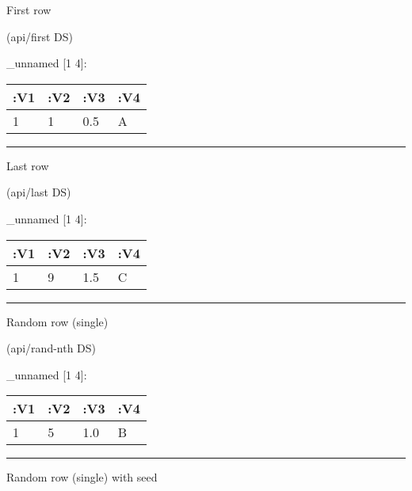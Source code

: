 \documentclass[]{article}
\newenvironment{Shaded}{\begin{snugshade}}{\end{snugshade}}
\newcommand{\NormalTok}[1]{#1}
\begin{document}
First row

\begin{Shaded}
\begin{Highlighting}[]
\NormalTok{(api/first DS)}
\end{Highlighting}
\end{Shaded}

\_unnamed {[}1 4{]}:

\begin{longtable}[]{@{}llll@{}}
\toprule
:V1 & :V2 & :V3 & :V4\tabularnewline
\midrule
\endhead
1 & 1 & 0.5 & A\tabularnewline
\bottomrule
\end{longtable}

\begin{center}\rule{0.5\linewidth}{0.5pt}\end{center}

Last row

\begin{Shaded}
\begin{Highlighting}[]
\NormalTok{(api/last DS)}
\end{Highlighting}
\end{Shaded}

\_unnamed {[}1 4{]}:

\begin{longtable}[]{@{}llll@{}}
\toprule
:V1 & :V2 & :V3 & :V4\tabularnewline
\midrule
\endhead
1 & 9 & 1.5 & C\tabularnewline
\bottomrule
\end{longtable}

\begin{center}\rule{0.5\linewidth}{0.5pt}\end{center}

Random row (single)

\begin{Shaded}
\begin{Highlighting}[]
\NormalTok{(api/rand-nth DS)}
\end{Highlighting}
\end{Shaded}

\_unnamed {[}1 4{]}:

\begin{longtable}[]{@{}llll@{}}
\toprule
:V1 & :V2 & :V3 & :V4\tabularnewline
\midrule
\endhead
1 & 5 & 1.0 & B\tabularnewline
\bottomrule
\end{longtable}

\begin{center}\rule{0.5\linewidth}{0.5pt}\end{center}

Random row (single) with seed
\end{document}
